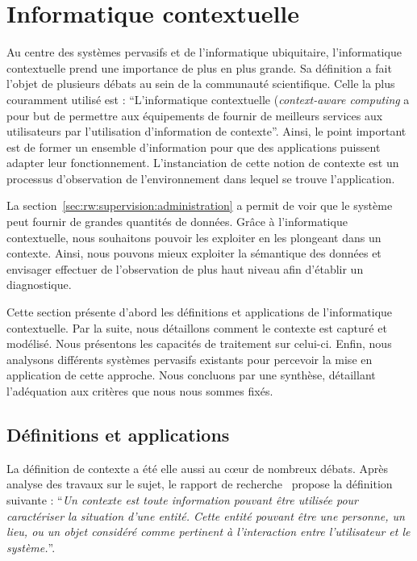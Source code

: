 \section{Informatique contextuelle}\label{sec:rw:supervision:contexte}
Au centre des systèmes pervasifs et de l'informatique ubiquitaire, l'informatique contextuelle prend une importance de plus en plus grande. Sa définition a fait l'objet de plusieurs débats au sein de la communauté scientifique. Celle la plus couramment utilisé est : \enquote{L'informatique contextuelle (\textit{context-aware computing} a pour but de permettre aux équipements de fournir de meilleurs services aux utilisateurs par l'utilisation d'information de contexte}\cite{Han:contextaware}. Ainsi, le point important est de former un ensemble d'information pour que des applications puissent adapter leur fonctionnement. L'instanciation de cette notion de contexte est un processus d'observation de l'environnement dans lequel se trouve l'application.

La section~\ref{sec:rw:supervision:administration} a permit de voir que le système peut fournir de grandes quantités de données. Grâce à l'informatique contextuelle, nous souhaitons pouvoir les exploiter en les plongeant dans un contexte. Ainsi, nous pouvons mieux exploiter la sémantique des données et envisager effectuer de l'observation de plus haut niveau afin d'établir un diagnostique.

Cette section présente d'abord les définitions et applications de l'informatique contextuelle. Par la suite, nous détaillons comment le contexte est capturé et modélisé. Nous présentons les capacités de traitement sur celui-ci. Enfin, nous analysons différents systèmes pervasifs existants pour percevoir la mise en application de cette approche. Nous concluons par une synthèse, détaillant l'adéquation aux critères que nous nous sommes fixés.
\subsection{Définitions et applications}
La définition de contexte a été elle aussi au cœur de nombreux débats. Après analyse des travaux sur le sujet, le rapport de recherche~\cite{Dey:context} propose la définition suivante : \enquote{\it Un contexte est toute information pouvant être utilisée pour caractériser la situation d'une entité. Cette entité pouvant être une personne, un lieu, ou un objet considéré comme pertinent à l'interaction entre l'utilisateur et le système.}.

